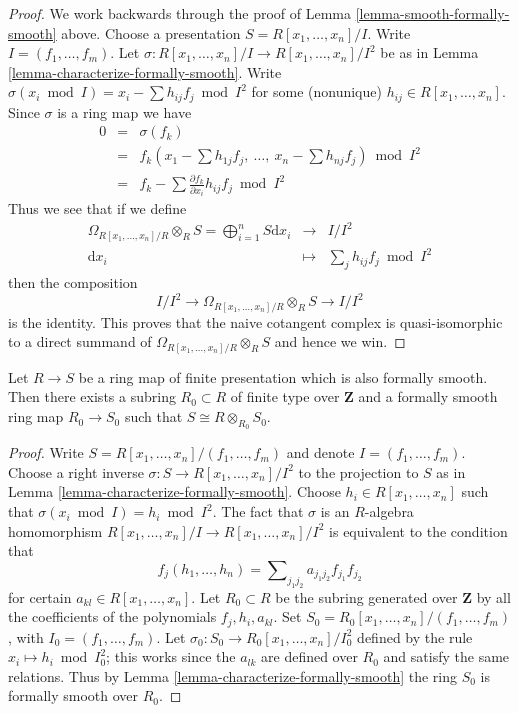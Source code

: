 \begin{proof}
We work backwards through the proof of
Lemma \ref{lemma-smooth-formally-smooth} above.
Choose a presentation $S = R[x_1, \ldots, x_n]/I$.
Write $I = (f_1, \ldots, f_m)$.
Let $\sigma : R[x_1, \ldots, x_n]/I \to R[x_1, \ldots, x_n]/I^2$
be as in Lemma \ref{lemma-characterize-formally-smooth}. Write
$\sigma(x_i \bmod I) = x_i - \sum h_{ij} f_j \bmod I^2$
for some (nonunique) $h_{ij} \in R[x_1, \ldots, x_n]$.
Since $\sigma$ is a ring map we have
\begin{eqnarray*}
0 & = & \sigma(f_k) \\
& = & 
f_k(x_1 - \sum h_{1j} f_j,\ \ldots,\ x_n - \sum h_{nj} f_j) \bmod I^2 \\
& = &
f_k - \sum \frac{\partial f_k}{\partial x_i} h_{ij} f_j \bmod I^2
\end{eqnarray*}
Thus we see that if we define
\begin{eqnarray*}
\Omega_{R[x_1, \ldots, x_n]/R} \otimes_R S
=
\bigoplus\nolimits_{i = 1}^n S \text{d}x_i
& \longrightarrow &
I/I^2 \\
\text{d}x_i & \longmapsto & \sum\nolimits_j h_{ij} f_j \bmod I^2
\end{eqnarray*}
then the composition
$$
I/I^2 \longrightarrow
\Omega_{R[x_1, \ldots, x_n]/R} \otimes_R S
\longrightarrow
I/I^2
$$
is the identity. This proves that the naive cotangent complex
is quasi-isomorphic to a direct summand of
$\Omega_{R[x_1, \ldots, x_n]/R} \otimes_R S$ and hence we win.
\end{proof}

\begin{lemma}
\label{lemma-finite-presentation-fs-Noetherian}
Let $R \to S$ be a ring map of finite presentation which is
also formally smooth. Then there exists a subring $R_0 \subset R$
of finite type over $\mathbf{Z}$ and a formally smooth
ring map $R_0 \to S_0$ such that $S \cong R \otimes_{R_0} S_0$.
\end{lemma}

\begin{proof}
Write $S = R[x_1, \ldots, x_n]/(f_1, \ldots, f_m)$
and denote $I = (f_1, \ldots, f_m)$.
Choose a right inverse
$\sigma : S \to R[x_1, \ldots, x_n]/I^2$
to the projection to $S$ as in
Lemma \ref{lemma-characterize-formally-smooth}.
Choose $h_i \in R[x_1, \ldots, x_n]$ such that
$\sigma(x_i \bmod I) = h_i \bmod I^2$.
The fact that $\sigma$ is an $R$-algebra homomorphism
$R[x_1, \ldots, x_n]/I \to R[x_1, \ldots, x_n]/I^2$
is equivalent to the condition that
$$
f_j(h_1, \ldots, h_n) = \sum\nolimits_{j_1 j_2} a_{j_1 j_2} f_{j_1} f_{j_2}
$$
for certain $a_{kl} \in R[x_1, \ldots, x_n]$.
Let $R_0 \subset R$ be the subring generated over $\mathbf{Z}$
by all the coefficients of the polynomials $f_j, h_i, a_{kl}$. 
Set $S_0 = R_0[x_1, \ldots, x_n]/(f_1, \ldots, f_m)$,
with $I_0 = (f_1, \ldots, f_m)$.
Let $\sigma_0 : S_0 \to R_0[x_1, \ldots, x_n]/I_0^2$ defined by
the rule $x_i \mapsto h_i \bmod I_0^2$; this works since the
$a_{lk}$ are defined over $R_0$ and satisfy the same relations.
Thus by Lemma \ref{lemma-characterize-formally-smooth}
the ring $S_0$ is formally smooth over $R_0$.
\end{proof}

